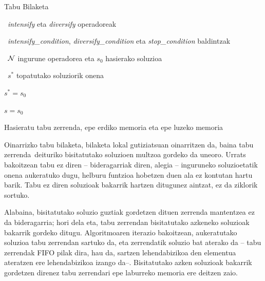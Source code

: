 \documentclass[eu]{ifirak}\usepackage[]{graphicx}\usepackage[]{color}
\newcommand{\zkk}{\guillemotleft}
\newcommand{\skk}{\guillemotright}
\begin{document}
\begin{ifalgorithm}[t]
\begin{ifpseudo}{Tabu Bilaketa}
\item \In\ \textit{intensify} eta \textit{diversify} operadoreak
\item \In\ \textit{intensify\_condition}, \textit{diversify\_condition} eta \textit{stop\_condition} baldintzak
\item \In\ $\cal N$ ingurune operadorea eta $s_0$ hasierako soluzioa
\item \Out\ $s^*$ topatutako soluziorik onena
\item $s^*=s_0$
\item $s = s_0$
\item Hasieratu tabu zerrenda, epe erdiko memoria eta epe luzeko memoria
\item {}
\item {}
\item {}
\item {}
\item {}
\item {}
\item \T{\EIf}
\item {}
\item {}
\item \T{\EIf}
\item \Done
\end{ifpseudo}
\caption{Tabu bilaketaren sasikodea}\label{alg:tabu}
\end{ifalgorithm}


Oinarrizko tabu bilaketa, bilaketa lokal gutiziatsuan oinarritzen da, baina \zkk tabu zerrenda\skk\ deituriko bisitatutako soluzioen multzoa gordeko da uneoro. Urrats bakoitzean tabu ez diren -- bideragarriak diren, alegia -- inguruneko soluzioetatik onena aukeratuko dugu, helburu funtzioa hobetzen duen ala ez kontutan hartu barik. Tabu ez diren soluzioak bakarrik hartzen ditugunez aintzat, ez da ziklorik sortuko.

Alabaina, bisitatutako soluzio guztiak gordetzen dituen zerrenda mantentzea ez da bideragarria; hori dela eta, tabu zerrendan bisitatutako azkeneko soluzioak bakarrik gordeko ditugu. Algoritmoaren iterazio bakoitzean, aukeratutako soluzioa tabu zerrendan sartuko da, eta zerrendatik soluzio bat aterako da -- tabu zerrendak FIFO pilak dira, hau da, sartzen lehendabizikoa den elementua ateratzen ere lehendabizikoa izango da--. Bisitatutako azken soluzioak bakarrik gordetzen direnez tabu zerrendari epe laburreko memoria ere deitzen zaio.
\end{document}
